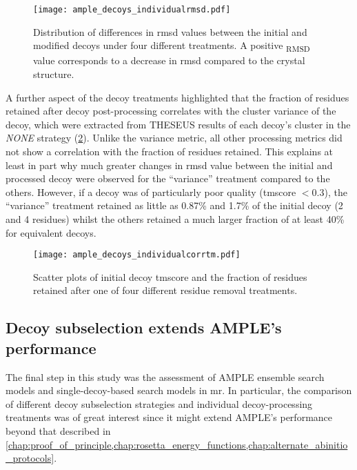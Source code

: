 \begin{figure}[H]
	\centering
	\texttt{[image: ample\_decoys\_individualrmsd.pdf]}
        \caption[Difference in RMSD for individually processed decoys]{Distribution of differences in \gls{rmsd} values between the initial and modified decoys under four different treatments. A positive \textDelta\textsubscript{RMSD} value corresponds to a decrease in \gls{rmsd} compared to the crystal structure.}
	\label{fig:ample_decoys_individualrmsd}
\end{figure}

A further aspect of the decoy treatments highlighted that the fraction of residues retained after decoy post-processing correlates with the cluster variance of the decoy, which were extracted from THESEUS results of each decoy's cluster in the \textit{NONE} strategy (\cref{fig:ample_decoys_individualcorrtm}). Unlike the variance metric, all other processing metrics did not show a correlation with the fraction of residues retained. This explains at least in part why much greater changes in \gls{rmsd} value between the initial and processed decoy were observed for the ``variance'' treatment compared to the others. However, if a decoy was of particularly poor quality (\gls{tmscore} $<0.3$), the ``variance'' treatment retained as little as 0.87\% and 1.7\% of the initial decoy (2 and 4 residues) whilst the others retained a much larger fraction of at least 40\% for equivalent decoys.

\begin{figure}[H]
        \centering
        \texttt{[image: ample\_decoys\_individualcorrtm.pdf]}
        \caption[Relationship between decoy quality and fraction of residues retained]{Scatter plots of initial decoy \gls{tmscore} and the fraction of residues retained after one of four different residue removal treatments.}
        \label{fig:ample_decoys_individualcorrtm}
\end{figure}

\subsection{Decoy subselection extends AMPLE's performance}
The final step in this study was the assessment of AMPLE ensemble search models and single-decoy-based search models in \gls{mr}. In particular, the comparison of different decoy subselection strategies and individual decoy-processing treatments was of great interest since it might extend AMPLE's performance beyond that described in \cref{chap:proof_of_principle,chap:rosetta_energy_functions,chap:alternate_abinitio_protocols}.

